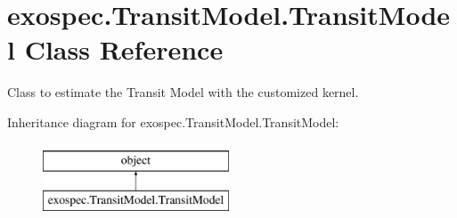 \hypertarget{classexospec_1_1_transit_model_1_1_transit_model}{}\section{exospec.\+Transit\+Model.\+Transit\+Model Class Reference}
\label{classexospec_1_1_transit_model_1_1_transit_model}


Class to estimate the Transit Model with the customized kernel.  


Inheritance diagram for exospec.\+Transit\+Model.\+Transit\+Model\+:\begin{figure}[H]
\begin{center}
\leavevmode
\includegraphics[height=2.000000cm]{classexospec_1_1_transit_model_1_1_transit_model}
\end{center}
\end{figure}
